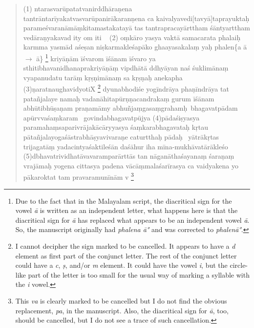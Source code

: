 \begin{quote}
	(1) ntarasvarūpatatvanirddhāraṇena tantrāntarīyakatvasva\-rū\-pa\-ni\-rā\-ka\-ra\ccs n\cce \ins ṇ\ine ena ca kaivalyavedi[tavyā]\-ta prayuktaḥ parameśvara\-nā\-māṃ\-ki\-ta\-ma\-sta\-ka\-tayā \ins ta\ine\ccs s ta\cce ntrapra\-ca\ins y\ine ārttham śāntyarttham ve\-dā\-ra\-ṇya\-ka\-va\-d ity om iti \HTG\ %
	(2) oṃkāro yasya vaktā samacarata phalaiḥ ka\-rmma yasmād aśeṣa\-n niṣkarmakleśapāko gha\-[ṭ]a\-ya\-[ti] sakalaṃ yaḥ phalen\{a ā $\rightarrow$ ā\}%
	\footnote{Due to the fact that in the Malayalam script, the diacritical sign for the vowel \emph{ā} is written as an independent letter, what happens here is that the diacritical sign for \emph{ā} has replaced what appears to be an independent vowel \emph{ā}. So, the manuscript originally had \emph{phalena ā°} and was corrected to \emph{phalenā°}.}%
	kri\-yāṇā\ccs m īśvaro\cce \ins m īś\ine ā\-na\-m īśvaro ya sthiti\-bhavanidhanapra\-kri\-yā\-ṇāṃ vi\ccs p\cce \ins dh\ine ā\-tā ddhyā\-ya\-n naś śu\-kli\-mā\-naṃ vya\-pa\-nu\-da\-tu ta\-rāṃ kṛṣṇimānaṃ sa kṛṣṇaḥ a\-ne\-ka\-pha\-%
	(3)ṇa\-ra\-tnau\-gha\-vi\-dyo\-ti\ccs X\cce%
	\footnote{I cannot decipher the sign marked to be cancelled. It appears to have a \emph{d} element as first part of the conjunct letter. The rest of the conjunct letter could have a \emph{c}, \emph{ṣ}, and/or \emph{m} element. It could have the vowel \emph{i}, but the circle-like part of the letter is too small for the usual way of marking a syllable with the \emph{i} vowel.} %
	dyu\-na\-bho\-di\-śe yo\-gī\-ndrā\-ya pha\-ṇī\-ndrā\-ya tat pa\-ta\-ñja\-la\-ye namaḥ va\-da\-nā\-hi\-ta\-pū\-rṇṇa\-ca\-ndra\-kaṃ gurum īśānam a\-bhū\-ti\-bhū\-ṣa\-ṇa\-m pra\-ṇa\-mā\-my a\-bhu\-ñjaṃ\-ga\-saṃ\-gra\-ha\ccs m\cce\ins ḥ\ine\ bha\-ga\-va\-tpā\-da\-m a\-pū\-rvva\-śaṃ\-ka\-ram \HTG\ go\-vi\-nda\-bha\-ga\-vatpū\-jya%
	(4)pā\-da\-śi\-ṣya\-sya pa\-ra\-ma\-haṃ\-sa\-pari\-vrā\-ja\-kā\-cā\-ryya\-sya śaṃ\-ka\-ra\-bha\-ga\-va\-taḥ kṛtau pā\-ta\-ñja\-la\-yoga\-śā\-stra\-bhā\-ṣya\-vi\-va\-ra\-ṇe catu\-rtthaḥ pādaḥ \HTG\ yā\-trā\-kṛ\-tas tri\-ja\-ga\-tāṃ ya\-da\-ci\-ntya\-śa\-kti\-le\-śān da\-śā\-hur iha mī\-na-mu\-khā\-va\-tā\-rā kle\-śo\-%
	(5)\-dbha\-va\-tri\-vi\-dha\-tā\-va\-va\-ra\-mpa\-rā\-rttās tan nā\-ga\-nā\-tha\-śa\-ya\-naṃ śa\-ra\-ṇaṃ vra\-jā\-maḥ yo\-ge\-na ci\-tta\-sya pa\-de\-na vā\-cā\ins ṃ\ine ma\-la\-śa\-rī\-ra\-sya ca vai\-dya\-ke\-na yo pā\-ka\-ro\ccs kta\cce\ins t ta\ine m pra\-va\-ra\-mu\-nī\-nām \ccs v\cce%
	\footnote{This \emph{va} is clearly marked to be cancelled but I do not find the obvious replacement, \emph{pa}, in the manuscript. Also, the diacritical sign for \emph{ā}, too, should be cancelled, but I do not see a trace of such  cancellation.}%

\end{quote}
